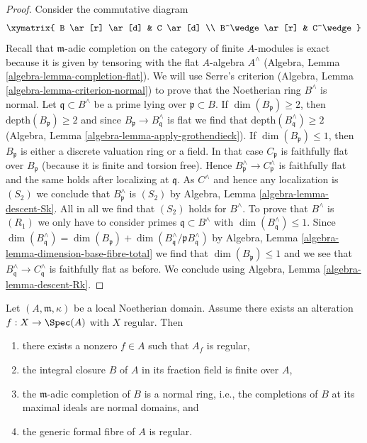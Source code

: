 \begin{proof}
Consider the commutative diagram
$$
\xymatrix{
B \ar[r] \ar[d] & C \ar[d] \\
B^\wedge \ar[r] & C^\wedge
}
$$
Recall that $\mathfrak m$-adic completion on the category of
finite $A$-modules is exact because it is given by tensoring with
the flat $A$-algebra $A^\wedge$
(Algebra, Lemma \ref{algebra-lemma-completion-flat}).
We will use Serre's criterion
(Algebra, Lemma \ref{algebra-lemma-criterion-normal})
to prove that the Noetherian ring $B^\wedge$ is normal.
Let $\mathfrak q \subset B^\wedge$ be a prime lying over
$\mathfrak p \subset B$. If $\dim(B_\mathfrak p) \geq 2$, then
$\text{depth}(B_\mathfrak p) \geq 2$ and since
$B_\mathfrak p \to B^\wedge_\mathfrak q$ is flat we find
that $\text{depth}(B^\wedge_\mathfrak q) \geq 2$
(Algebra, Lemma \ref{algebra-lemma-apply-grothendieck}).
If $\dim(B_\mathfrak p) \leq 1$, then $B_\mathfrak p$ is
either a discrete valuation ring or a field.
In that case $C_\mathfrak p$ is faithfully flat over $B_\mathfrak p$
(because it is finite and torsion free).
Hence $B^\wedge_\mathfrak p \to C^\wedge_\mathfrak p$ is
faithfully flat and the same holds after localizing at $\mathfrak q$.
As $C^\wedge$ and hence any localization is $(S_2)$ we conclude that
$B^\wedge_\mathfrak p$ is $(S_2)$ by
Algebra, Lemma \ref{algebra-lemma-descent-Sk}.
All in all we find that
$(S_2)$ holds for $B^\wedge$. To prove that $B^\wedge$ is
$(R_1)$ we only have to consider primes $\mathfrak q \subset B^\wedge$
with $\dim(B^\wedge_\mathfrak q) \leq 1$. Since
$\dim(B^\wedge_\mathfrak q) = \dim(B_\mathfrak p) +
\dim(B^\wedge_\mathfrak q/\mathfrak p B^\wedge_\mathfrak q)$ by
Algebra, Lemma \ref{algebra-lemma-dimension-base-fibre-total}
we find that $\dim(B_\mathfrak p) \leq 1$ and
we see that $B^\wedge_\mathfrak q \to C^\wedge_\mathfrak q$
is faithfully flat as before. We conclude using
Algebra, Lemma \ref{algebra-lemma-descent-Rk}.
\end{proof}

\begin{lemma}
\label{lemma-regular-alteration-implies-local}
Let $(A, \mathfrak m, \kappa)$ be a local Noetherian domain.
Assume there exists an alteration $f : X \to \Spec(A)$
with $X$ regular. Then
\begin{enumerate}
\item there exists a nonzero $f \in A$ such that $A_f$ is regular,
\item the integral closure $B$ of $A$ in its fraction field is finite over $A$,
\item the $\mathfrak m$-adic completion of $B$ is a normal ring, i.e., the
completions of $B$ at its maximal ideals are normal domains, and
\item the generic formal fibre of $A$ is regular.
\end{enumerate}
\end{lemma}

